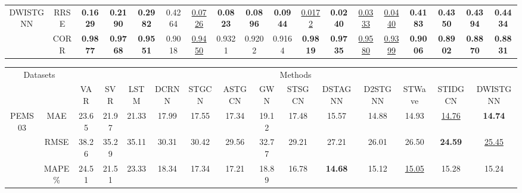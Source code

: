 \documentclass[final,12pt]{elsarticle}
\begin{document}
\begin{landscape}
\begin{table}[h]
\begin{subtable}[h]{0.48\textwidth}
\begin{center}
\begin{tabular}{|*{18}{c|}}
    \hline
    \multirow{2}{*}{DWISTGNN}  %
    & RRSE 
    & \textbf{0.1629} & \textbf{0.2190} & \textbf{0.2982} & 0.4264 
    & \underline{0.0726} & \textbf{0.0823} & \textbf{0.0896} & \textbf{0.0944} 
    & \underline{0.0172} & \textbf{0.0240} & \underline{0.0333} & \underline{0.0440} 
    & \textbf{0.4183} & \textbf{0.4350} & \textbf{0.4394} & \textbf{0.4434}  \\
    \cline{2-18}
    & CORR 
    & \textbf{0.9877} &  \textbf{0.9768} & \textbf{0.9551} & 0.9018 
    & \underline{0.9450} & 0.9321 & 0.9202 & 0.9164 
    & \textbf{0.9819} & \textbf{0.9735} & \underline{0.9580} & \underline{0.9399} 
    & \textbf{0.9006} & \textbf{0.8902} & \textbf{0.8870} & \textbf{0.8831}  \\

    \hline

  \end{tabular}
  \end{center}

  \end{subtable}


  \hfill


  \begin{subtable}[h]{0.48\textwidth}
  \label{subtable-5}

  \tiny
  \centering
  \renewcommand{\arraystretch}{1.2}

  \begin{center}
  \begin{tabular}{|*{15}{c|}}

    \hline
      \multicolumn{2}{|c|}{\multirow{2}{*}{Datasets}} 
    & \multicolumn{13}{c|}{Methods}  \\
    \cline{3-15}
      \multicolumn{2}{|c|}{} 
    & VAR & SVR & LSTM 
    & DCRNN & STGCN & ASTGCN & GWN & STSGCN 
    & DSTAGNN & D2STGNN & STWave & STIDGCN 
    & DWISTGNN  \\

    \hline
    \multirow{3}{*}{PEMS03} 
    & MAE     & 23.65 & 21.97 & 21.33 & 17.99 
              & 17.55 & 17.34 & 19.12 & 17.48 
              & 15.57 & 14.88 & 14.93 & \underline{14.76}     & \textbf{14.74}     \\
    \cline{2-15}
    & RMSE    & 38.26 & 35.29 & 35.11 & 30.31 
              & 30.42 & 29.56 & 32.77 & 29.21 
              & 27.21 & 26.01 & 26.50 & \textbf{24.59}        & \underline{25.45}  \\
    \cline{2-15}
    & MAPE\%  & 24.51 & 21.51 & 23.33 & 18.34 
              & 17.34 & 17.21 & 18.89 & 16.78 
              & \textbf{14.68} & 15.12 & \underline{15.05}    & 15.28   & 15.24  \\


\end{tabular}
\end{center}
\end{subtable}
\end{table}
\end{landscape}
\end{document}
